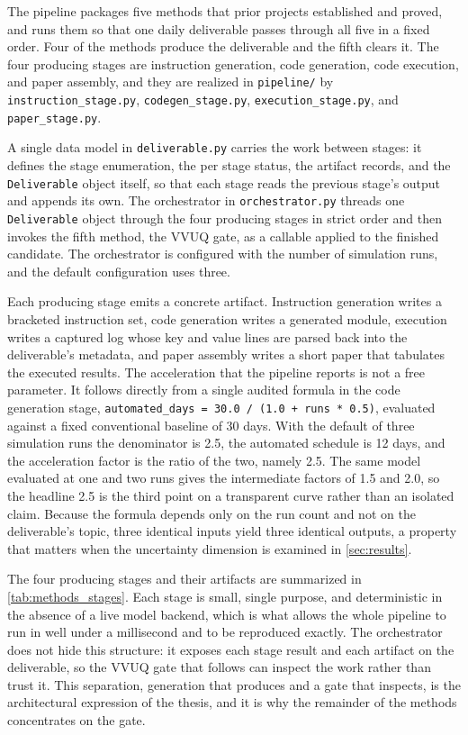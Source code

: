 The pipeline packages five methods that prior projects established and proved,
and runs them so that one daily deliverable passes through all five in a fixed
order. Four of the methods produce the deliverable and the fifth clears it. The
four producing stages are instruction generation, code generation, code
execution, and paper assembly, and they are realized in \texttt{pipeline/} by
\texttt{instruction\_stage.py}, \texttt{codegen\_stage.py},
\texttt{execution\_stage.py}, and \texttt{paper\_stage.py}. 

A single
data model in \texttt{deliverable.py} carries the work between stages: it defines
the stage enumeration, the per stage status, the artifact records, and the
\texttt{Deliverable} object itself, so that each stage reads the previous stage's
output and appends its own. The orchestrator in \texttt{orchestrator.py} threads
one \texttt{Deliverable} object through the four producing stages in strict order
and then invokes the fifth method, the VVUQ gate, as a callable applied to the
finished candidate. The orchestrator is configured with the number of simulation
runs, and the default configuration uses three.

Each producing stage emits a concrete artifact. Instruction generation writes a
bracketed instruction set, code generation writes a generated module, execution
writes a captured log whose key and value lines are parsed back into the
deliverable's metadata, and paper assembly writes a short paper that tabulates
the executed results. The acceleration that the pipeline reports is not a free
parameter. It follows directly from a single audited formula in the code
generation stage, \texttt{automated\_days = 30.0 / (1.0 + runs * 0.5)}, evaluated
against a fixed conventional baseline of 30 days. With the default of three
simulation runs the denominator is 2.5, the automated schedule is 12 days, and
the acceleration factor is the ratio of the two, namely 2.5. The same model
evaluated at one and two runs gives the intermediate factors of 1.5 and 2.0, so
the headline 2.5 is the third point on a transparent curve rather than an
isolated claim. Because the formula depends only on the run count and not on the
deliverable's topic, three identical inputs yield three identical outputs, a
property that matters when the uncertainty dimension is examined in
\autoref{sec:results}.

The four producing stages and their artifacts are summarized in
\autoref{tab:methods_stages}. Each stage is small, single purpose, and
deterministic in the absence of a live model backend, which is what allows the
whole pipeline to run in well under a millisecond and to be reproduced exactly.
The orchestrator does not hide this structure: it exposes each stage result and
each artifact on the deliverable, so the VVUQ gate that follows can inspect the
work rather than trust it. This separation, generation that produces and a gate
that inspects, is the architectural expression of the thesis, and it is why the
remainder of the methods concentrates on the gate.


